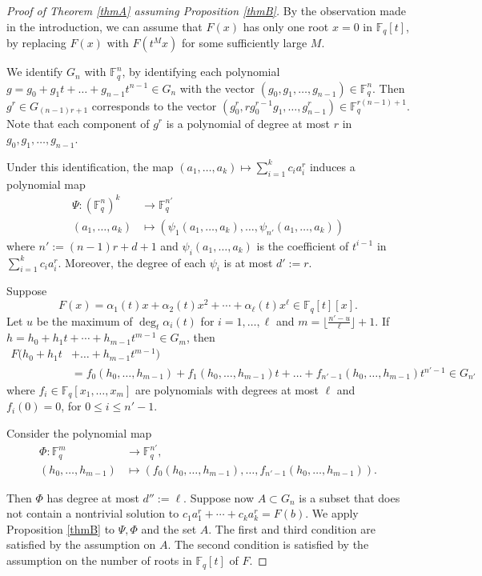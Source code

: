 \documentclass[11pt]{amsart}
\newcommand{\F}{\mathbb{F}}
\newcommand\Fq{{\mathbb{F}_q}}
\theoremstyle{definition}
\theoremstyle{remark}
\begin{document}
\begin{proof}[Proof of Theorem \ref{thmA} assuming Proposition \ref{thmB}]
By the observation made in the introduction, we can assume that $F(x)$ has only one root $x=0$ in $\Fq[t]$, by replacing $F(x)$ with $F(t^Mx)$ for some sufficiently large $M$.

We identify $G_n$ with $\F_q^n$, by identifying each polynomial $g=g_0+g_1t+\dots+ g_{n-1}t^{n-1} \in G_n$ with the vector $(g_0,g_1, \dots , g_{n-1})\in \mathbb{F}_q^n$. Then $g^r \in G_{(n-1)r+1}$ corresponds to the vector $(g_0^r, rg_0^{r-1}g_1,\ldots,g_{n-1}^r) \in \mathbb{F}_q^{r(n-1)+1}$. Note that each component of $g^r$ is a polynomial of degree at most $r$ in $g_0,g_1, \dots , g_{n-1}$. 
	
Under this identification, the map 
$
	(a_1,\dots, a_k) \mapsto \sum ^k_{i=1} c_i a_i^r
$
induces a polynomial map 
\begin{align*}
\Psi: (\mathbb{F}_q^n)^k & \rightarrow \mathbb{F}_q^{n'} \\  %
	(a_1,\dots, a_k) & \mapsto (\psi_1 (a_1,\dots, a_k), \ldots, \psi_{n'} (a_1,\dots, a_k) )
\end{align*}	
where $n':=(n-1)r+d+1$ and $\psi_i (a_1,\dots, a_k)$ is the coefficient of $t^{i-1}$ in $\sum ^k_{i=1} c_i a_i^r$. Moreover, the degree of each $\psi_i$ is at most $d':=r$.
	
Suppose 
\[
F(x) = \alpha_1(t) x+ \alpha_2(t) x^2+\cdots +\alpha_{\ell}(t) x^\ell \in \Fq[t][x].
\]
Let $u$ be the maximum of $\deg_t \alpha_{i}(t)$ for $i=1, \ldots, \ell$ and $m = \lfloor {\frac{n'-u}{\ell}}\rfloor +1$. If $h= h_0+h_1t+\cdots+h_{m-1}t^{m-1} \in G_m$, then 
	\begin{align*}
		F(h_0+h_1t&+\dots+h_{m-1}t^{m-1})\\
		&= f_0(h_0,\dots, h_{m-1})+f_1(h_0,\dots, h_{m-1})t+\dots+f_{n'-1}(h_0,\dots, h_{m-1})t^{n'-1} \in G_{n'}
	\end{align*}
	where $f_i \in \Fq[x_1, \dots,x_m]$ are polynomials with degrees at most $\ell$ and $f_i(0)=0$, for $0 \leq i\leq n'-1$.
	
Consider the polynomial map 
\begin{align*}
\Phi:\mathbb{F}_q^m & \rightarrow \mathbb{F}_q^{n'}, \\
(h_0, \ldots, h_{m-1}) &\mapsto (f_0(h_0,\dots, h_{m-1}), \ldots, f_{n'-1}(h_0,\dots, h_{m-1})). 
\end{align*}
	
Then $\Phi$ has degree at most $d'':=\ell$.  Suppose now $A \subset G_n$ is a subset that does not contain a nontrivial solution to $c_1 a_1 ^r + \cdots + c_k a_k^r = F(b)$.
We apply Proposition \ref{thmB} to $\Psi, \Phi$ and the set $A$. The first and third condition are satisfied by the assumption on $A$. The second condition is satisfied by the assumption on the number of roots in $\Fq[t]$ of $F$. 


\end{proof}
\end{document}
